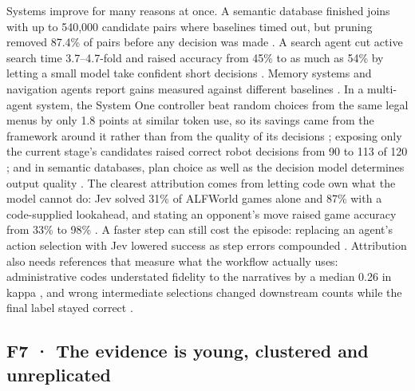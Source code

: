 Systems improve for many reasons at once. A semantic database finished joins with up to 540,000 candidate pairs where baselines timed out, but pruning removed 87.4\% of pairs before any decision was made \citep{arxiv2610_02046}. A search agent cut active search time 3.7–4.7-fold and raised accuracy from 45\% to as much as 54\% by letting a small model take confident short decisions \citep{arxiv2610_05107}. Memory systems and navigation agents report gains measured against different baselines \citep{arxiv2609_23986,arxiv2609_36059,arxiv2609_34969}. In a multi-agent system, the System One controller beat random choices from the same legal menus by only 1.8 points at similar token use, so its savings came from the framework around it rather than from the quality of its decisions \citep{arxiv2610_08155}; exposing only the current stage's candidates raised correct robot decisions from 90 to 113 of 120 \citep{arxiv2610_07327}; and in semantic databases, plan choice as well as the decision model determines output quality \citep{arxiv2610_08089}. The clearest attribution comes from letting code own what the model cannot do: Jev solved 31\% of ALFWorld games alone and 87\% with a code-supplied lookahead, and stating an opponent's move raised game accuracy from 33\% to 98\% \citep{arxiv2610_01834}. A faster step can still cost the episode: replacing an agent's action selection with Jev lowered success as step errors compounded \citep{arxiv2610_03935}. Attribution also needs references that measure what the workflow actually uses: administrative codes understated fidelity to the narratives by a median 0.26 in kappa \citep{arxiv2609_24052}, and wrong intermediate selections changed downstream counts while the final label stayed correct \citep{arxiv2609_24965}.

\subsection{F7 · The evidence is young, clustered and unreplicated}

